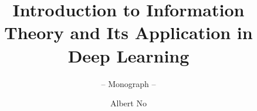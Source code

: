 \documentclass[graybox,envcountchap,sectrefs]{svmono}
\begin{document}
\author{Albert No}
\title{Introduction to Information Theory and Its Application in Deep Learning}
\subtitle{-- Monograph --}
\maketitle

\frontmatter%

% 
% 

% 

\tableofcontents

% 


\mainmatter%






% 
% 
\printindex

\end{document}
